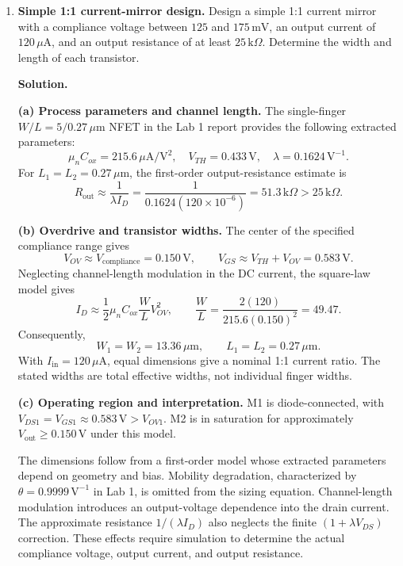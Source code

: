 \documentclass[12pt,letterpaper]{article}
\begin{document}
\begin{enumerate}
\textbf{(c) Low-voltage cascode current mirror.}
A separate bias branch sets the cascode gate voltage, allowing high
output resistance and good current matching with an ideal minimum
compliance voltage near $2V_{OV}$.
This is lower than the conventional cascode requirement but higher
than that of the simple mirror. The additional bias transistor and
bias current increase circuit complexity. Saturation margin increases
the practical compliance voltage above the ideal minimum.

\newpage
\item \textbf{Simple 1:1 current-mirror design.}
Design a simple 1:1 current mirror with a compliance voltage between
$125$ and $175\,\mathrm{mV}$, an output current of
$120\,\mu\mathrm{A}$, and an output resistance of at least
$25\,\mathrm{k}\Omega$. Determine the width and length of each transistor.

\textbf{Solution.}

\textbf{(a) Process parameters and channel length.}
The single-finger $W/L=5/0.27\,\mu\mathrm{m}$ NFET in the Lab 1
report provides the following extracted parameters:
\[
\mu_nC_{ox}=215.6\,\mu\mathrm{A}/\mathrm{V}^2,\quad
V_{TH}=0.433\,\mathrm{V},\quad \lambda=0.1624\,\mathrm{V}^{-1}.
\]
For $L_1=L_2=0.27\,\mu\mathrm{m}$, the first-order output-resistance
estimate is
\[
R_{\mathrm{out}}\approx\frac{1}{\lambda I_D}
=\frac{1}{0.1624(120\times10^{-6})}
=51.3\,\mathrm{k}\Omega>25\,\mathrm{k}\Omega.
\]

\textbf{(b) Overdrive and transistor widths.}
The center of the specified compliance range gives
\[
V_{OV}\approx V_{\mathrm{compliance}}=0.150\,\mathrm{V},\qquad
V_{GS}\approx V_{TH}+V_{OV}=0.583\,\mathrm{V}.
\]
Neglecting channel-length modulation in the DC current, the
square-law model gives
\[
I_D\approx\frac12\mu_nC_{ox}\frac WL V_{OV}^2,
\qquad
\frac WL=\frac{2(120)}{215.6(0.150)^2}=49.47.
\]
Consequently,
\[
\boxed{W_1=W_2=13.36\,\mu\mathrm{m},\qquad
L_1=L_2=0.27\,\mu\mathrm{m}.}
\]
With $I_{\mathrm{in}}=120\,\mu\mathrm{A}$, equal dimensions give a
nominal 1:1 current ratio. The stated widths are total effective
widths, not individual finger widths.

\textbf{(c) Operating region and interpretation.}
M1 is diode-connected, with $V_{DS1}=V_{GS1}\approx0.583\,\mathrm{V}
>V_{OV1}$. M2 is in saturation for approximately
$V_{\mathrm{out}}\ge0.150\,\mathrm{V}$ under this model.

The dimensions follow from a first-order model whose extracted
parameters depend on geometry and bias. Mobility degradation,
characterized by $\theta=0.9999\,\mathrm{V}^{-1}$ in Lab 1, is omitted
from the sizing equation. Channel-length modulation introduces an
output-voltage dependence into the drain current. The approximate resistance
$1/(\lambda I_D)$ also neglects the finite $(1+\lambda V_{DS})$
correction. These effects require simulation to determine the actual
compliance voltage, output current, and output resistance.


\end{enumerate}
\end{document}
